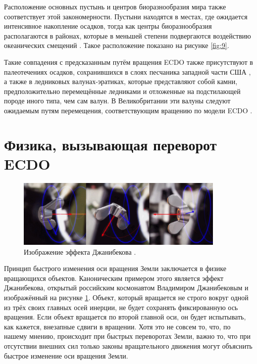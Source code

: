 \documentclass[10pt,twocolumn,letterpaper]{article}
\begin{document}
Расположение основных пустынь и центров биоразнообразия мира также соответствует этой закономерности. Пустыни находятся в местах, где ожидается интенсивное накопление осадков, тогда как центры биоразнообразия располагаются в районах, которые в меньшей степени подвергаются воздействию океанических смещений \cite{28}. Такое расположение показано на рисунке \ref{fig:9}.

Такие совпадения с предсказанным путём вращения ECDO также присутствуют в палеотечениях осадков, сохранившихся в слоях песчаника западной части США \cite{21}, а также в ледниковых валунах-эратиках, которые представляют собой камни, предположительно перемещённые ледниками и отложенные на подстилающей породе иного типа, чем сам валун. В Великобритании эти валуны следуют ожидаемым путям перемещения, соответствующим вращению по модели ECDO \cite{67,68}.

\section{Физика, вызывающая переворот ECDO}

\begin{figure}
\begin{center}

\includegraphics[width=0.9\textwidth]{dzhani.jpg}
\end{center}
   \caption{Изображение эффекта Джанибекова \cite{28}.}
\label{fig:10}
\end{figure}

Принцип быстрого изменения оси вращения Земли заключается в физике вращающихся объектов. Каноническим примером этого является эффект Джанибекова, открытый российским космонавтом Владимиром Джанибековым \cite{37} и изображённый на рисунке \ref{fig:10}. Объект, который вращается не строго вокруг одной из трёх своих главных осей инерции, не будет сохранять фиксированную ось вращения. Если объект вращается по второй главной оси, он будет испытывать, как кажется, внезапные сдвиги в вращении. Хотя это не совсем то, что, по нашему мнению, происходит при быстрых переворотах Земли, важно то, что при отсутствии внешних сил только законы вращательного движения могут объяснить быстрое изменение оси вращения Земли.
\end{document}
